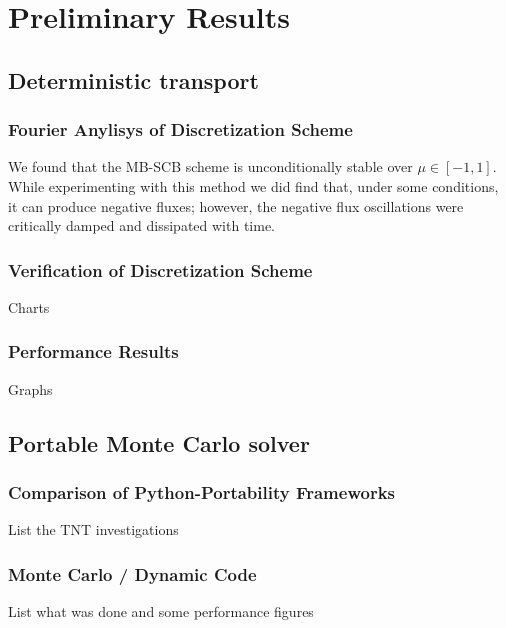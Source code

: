 \chapter{Preliminary Results}
\label{ch:results}

\section{Deterministic transport}

\subsection{Fourier Anylisys of Discretization Scheme}
We found that the MB-SCB scheme is unconditionally stable over $\mu \in [-1, 1]$. While experimenting with this method we did find that, under some conditions, it can produce negative fluxes; however, the negative flux oscillations were critically damped and dissipated with time.

\subsection{Verification of Discretization Scheme}
Charts

\subsection{Performance Results}
Graphs

\section{Portable Monte Carlo solver}

\subsection{Comparison of Python-Portability Frameworks}
List the TNT investigations

\subsection{Monte Carlo / Dynamic Code}
List what was done and some performance figures